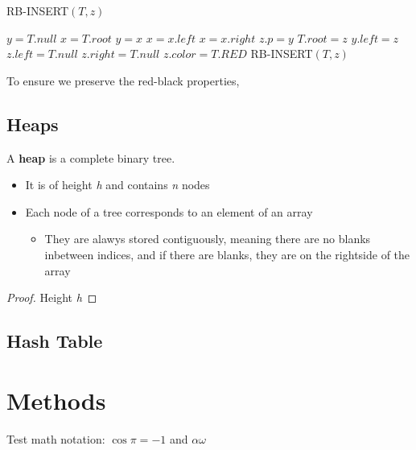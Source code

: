 \documentclass[10pt, 
a4paper, 
oneside, 
headinclude, footinclude, 
BCOR5mm]
{scrartcl}
\begin{document}
\begin{algorithm}
    \caption{RB-INSERT$(T,z)$}
    \BlankLine

    $y=T.null$\;
    $x=T.root$\;
        {$y=x$\;        
            {$x=x.left$\;}
        {$x=x.right$\;}}
    $z.p=y$\;
        {$T.root=z$\;}
        {$y.left=z$\;}
    $z.left=T.null$\;
    $z.right=T.null$\;
    $z.color=T.RED$\;
    RB-INSERT$(T,z)$\;
    
\end{algorithm}

To ensure we preserve the {\color{red}red}-black properties, 

\newpage

\subsection{Heaps}
A \textbf{heap} is a complete binary tree.
\begin{itemize}
    \item It is of height \textit{h} and contains \textit{n} nodes
    \item Each node of a tree corresponds to an element of an array
    \begin{itemize}
        \item They are alawys stored contiguously, meaning there are no blanks inbetween indices, and if there are blanks, they are on the rightside of the array
    \end{itemize} 
\end{itemize}

\begin{proof}
    Height \textit{h}
\end{proof}

\newpage
\subsection{Hash Table}



\section{Methods}

Test math notation: $\cos\pi=-1$ and $\alpha\omega$
\end{document}
